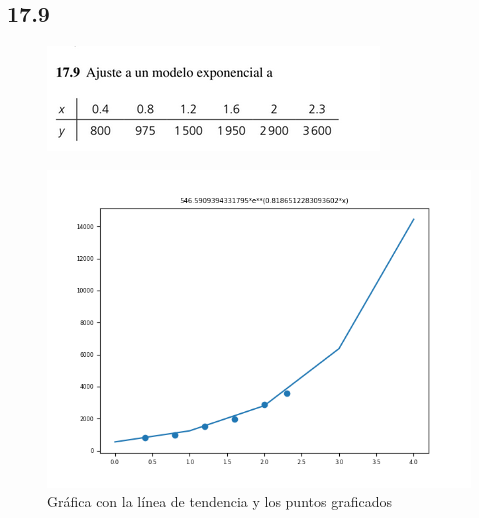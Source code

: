 \documentclass[12pt,oneside,FLEQN]{report}
\begin{document}
{		\subsection{17.9}
			\begin{figure}[!h]
				\centering
				\includegraphics[scale=0.5]{179e.png}
				\caption{}
			\end{figure}
			\begin{figure}[!h]
				\centering
				\includegraphics[scale=0.3]{179.png}
				\caption{Gráfica con la línea de tendencia y los puntos graficados}
			\end{figure}
}
\end{document}
